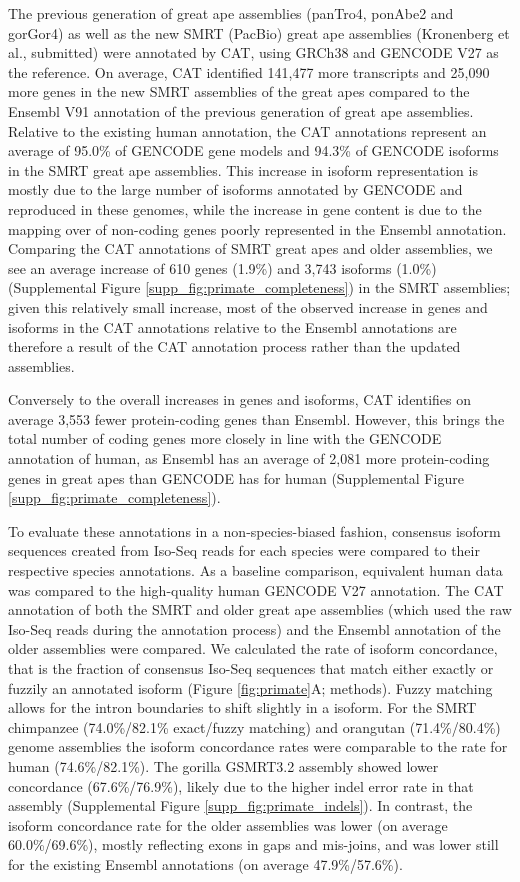 \documentclass[fleqn,10pt]{wlscirep}
\begin{document}
The previous generation of great ape assemblies (panTro4, ponAbe2 and gorGor4) as well as the new SMRT (PacBio) great ape assemblies \cite{gordon2016long} (Kronenberg et al., submitted) were annotated by CAT, using GRCh38 and GENCODE V27 as the reference. On average, CAT identified 141,477 more transcripts and 25,090 more genes in the new SMRT assemblies of the great apes compared to the Ensembl V91 annotation of the previous generation of great ape assemblies. Relative to the existing human annotation, the CAT annotations represent an average of 95.0\% of GENCODE gene models and 94.3\% of GENCODE isoforms in the SMRT great ape assemblies. This increase in isoform representation is mostly due to the large number of isoforms annotated by GENCODE and reproduced in these genomes, while the increase in gene content is due to the mapping over of non-coding genes poorly represented in the Ensembl annotation. Comparing the CAT annotations of SMRT great apes and older assemblies, we see an average increase of 610 genes (1.9\%) and 3,743 isoforms (1.0\%) (Supplemental Figure \ref{supp_fig:primate_completeness}) in the SMRT assemblies; given this relatively small increase, most of the observed increase in genes and isoforms in the CAT annotations relative to the Ensembl annotations are therefore a result of the CAT annotation process rather than the updated assemblies.

Conversely to the overall increases in genes and isoforms, CAT identifies on average 3,553 fewer protein-coding genes than Ensembl. However, this brings the total number of coding genes more closely in line with the GENCODE annotation of human, as Ensembl has an average of 2,081 more protein-coding genes in great apes than GENCODE has for human (Supplemental Figure \ref{supp_fig:primate_completeness}). 

To evaluate these annotations in a non-species-biased fashion, consensus isoform sequences created from Iso-Seq reads for each species were compared to their respective species annotations. As a baseline comparison, equivalent human data was compared to the high-quality human GENCODE V27 annotation. The CAT annotation of both the SMRT and older great ape assemblies (which used the raw Iso-Seq reads during the annotation process) and the Ensembl annotation of the older assemblies were compared. We calculated the rate of isoform concordance, that is the fraction of consensus Iso-Seq sequences that match either exactly or fuzzily an annotated isoform (Figure \ref{fig:primate}A; methods). Fuzzy matching allows for the intron boundaries to shift slightly in a isoform. For the SMRT chimpanzee (74.0\%/82.1\% exact/fuzzy matching) and orangutan (71.4\%/80.4\%) genome assemblies the isoform concordance rates were comparable to the rate for human (74.6\%/82.1\%). The gorilla GSMRT3.2 assembly showed lower concordance (67.6\%/76.9\%), likely due to the higher indel error rate in that assembly (Supplemental Figure \ref{supp_fig:primate_indels}). In contrast, the isoform concordance rate for the older assemblies was lower (on average 60.0\%/69.6\%), mostly reflecting exons in gaps and mis-joins, and was lower still for the existing Ensembl annotations (on average 47.9\%/57.6\%).
\end{document}
